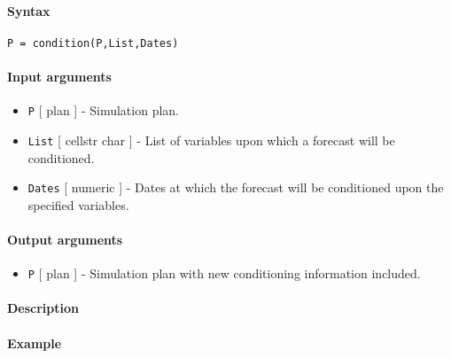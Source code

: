 


	\paragraph{Syntax}

\begin{verbatim}
P = condition(P,List,Dates)
\end{verbatim}

\paragraph{Input arguments}

\begin{itemize}
\item
  \texttt{P} {[} plan {]} - Simulation plan.
\item
  \texttt{List} {[} cellstr \textbar{} char {]} - List of variables upon
  which a forecast will be conditioned.
\item
  \texttt{Dates} {[} numeric {]} - Dates at which the forecast will be
  conditioned upon the specified variables.
\end{itemize}

\paragraph{Output arguments}

\begin{itemize}
\itemsep1pt\parskip0pt
\item
  \texttt{P} {[} plan {]} - Simulation plan with new conditioning
  information included.
\end{itemize}

\paragraph{Description}

\paragraph{Example}


